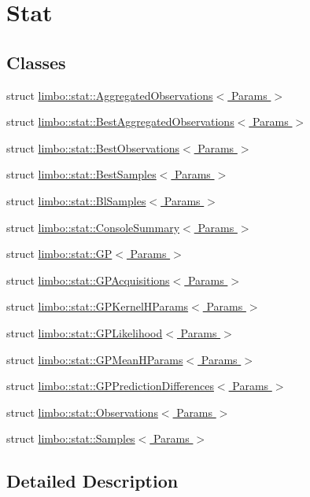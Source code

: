 \hypertarget{group__stat}{}\section{Stat}
\label{group__stat}
\subsection*{Classes}
\begin{DoxyCompactItemize}
\item 
struct \hyperlink{structlimbo_1_1stat_1_1_aggregated_observations}{limbo\+::stat\+::\+Aggregated\+Observations$<$ Params $>$}
\item 
struct \hyperlink{structlimbo_1_1stat_1_1_best_aggregated_observations}{limbo\+::stat\+::\+Best\+Aggregated\+Observations$<$ Params $>$}
\item 
struct \hyperlink{structlimbo_1_1stat_1_1_best_observations}{limbo\+::stat\+::\+Best\+Observations$<$ Params $>$}
\item 
struct \hyperlink{structlimbo_1_1stat_1_1_best_samples}{limbo\+::stat\+::\+Best\+Samples$<$ Params $>$}
\item 
struct \hyperlink{structlimbo_1_1stat_1_1_bl_samples}{limbo\+::stat\+::\+Bl\+Samples$<$ Params $>$}
\item 
struct \hyperlink{structlimbo_1_1stat_1_1_console_summary}{limbo\+::stat\+::\+Console\+Summary$<$ Params $>$}
\item 
struct \hyperlink{structlimbo_1_1stat_1_1_g_p}{limbo\+::stat\+::\+G\+P$<$ Params $>$}
\item 
struct \hyperlink{structlimbo_1_1stat_1_1_g_p_acquisitions}{limbo\+::stat\+::\+G\+P\+Acquisitions$<$ Params $>$}
\item 
struct \hyperlink{structlimbo_1_1stat_1_1_g_p_kernel_h_params}{limbo\+::stat\+::\+G\+P\+Kernel\+H\+Params$<$ Params $>$}
\item 
struct \hyperlink{structlimbo_1_1stat_1_1_g_p_likelihood}{limbo\+::stat\+::\+G\+P\+Likelihood$<$ Params $>$}
\item 
struct \hyperlink{structlimbo_1_1stat_1_1_g_p_mean_h_params}{limbo\+::stat\+::\+G\+P\+Mean\+H\+Params$<$ Params $>$}
\item 
struct \hyperlink{structlimbo_1_1stat_1_1_g_p_prediction_differences}{limbo\+::stat\+::\+G\+P\+Prediction\+Differences$<$ Params $>$}
\item 
struct \hyperlink{structlimbo_1_1stat_1_1_observations}{limbo\+::stat\+::\+Observations$<$ Params $>$}
\item 
struct \hyperlink{structlimbo_1_1stat_1_1_samples}{limbo\+::stat\+::\+Samples$<$ Params $>$}
\end{DoxyCompactItemize}


\subsection{Detailed Description}
